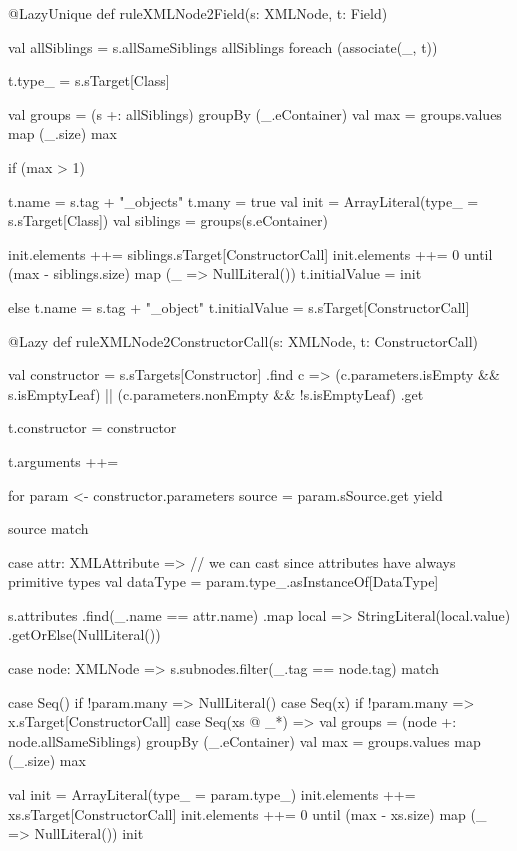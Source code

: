 \begin{scalacode}
@LazyUnique
def ruleXMLNode2Field(s: XMLNode, t: Field) {
  val allSiblings = s.allSameSiblings
  allSiblings foreach (associate(_, t))

  t.type_ = s.sTarget[Class]

  val groups = (s +: allSiblings) groupBy (_.eContainer)
  val max = groups.values map (_.size) max

  if (max > 1) {
    t.name = s.tag + "_objects"
    t.many = true
    val init = ArrayLiteral(type_ = s.sTarget[Class])
    val siblings = groups(s.eContainer)
    
    init.elements ++= siblings.sTarget[ConstructorCall]
    init.elements ++= 0 until (max - siblings.size) map (_ => NullLiteral())
    t.initialValue = init
  } else {
    t.name = s.tag + "_object"
    t.initialValue = s.sTarget[ConstructorCall]
  }
}  
\end{scalacode}

\begin{scalacode}
@Lazy
def ruleXMLNode2ConstructorCall(s: XMLNode, t: ConstructorCall) {
  val constructor = s.sTargets[Constructor]
    .find { c =>
      (c.parameters.isEmpty && s.isEmptyLeaf) ||
      (c.parameters.nonEmpty && !s.isEmptyLeaf)
    }
    .get

  t.constructor = constructor

  t.arguments ++= {
    for {
      param <- constructor.parameters
      source = param.sSource.get
    } yield {
      source match {
        case attr: XMLAttribute =>
          // we can cast since attributes have always primitive types
          val dataType = param.type_.asInstanceOf[DataType]

          s.attributes
            .find(_.name == attr.name)
            .map { local => StringLiteral(local.value) }
            .getOrElse(NullLiteral())

        case node: XMLNode =>
          s.subnodes.filter(_.tag == node.tag) match {

            case Seq() if !param.many =>
              NullLiteral()
            case Seq(x) if !param.many =>
              x.sTarget[ConstructorCall]
            case Seq(xs @ _*) =>
              val groups = (node +: node.allSameSiblings) groupBy (_.eContainer)
              val max = groups.values map (_.size) max
              
              val init = ArrayLiteral(type_ = param.type_)
              init.elements ++= xs.sTarget[ConstructorCall]
              init.elements ++= 0 until (max - xs.size) map (_ => NullLiteral())
              init
          }
      }
    }
  }
}
\end{scalacode}